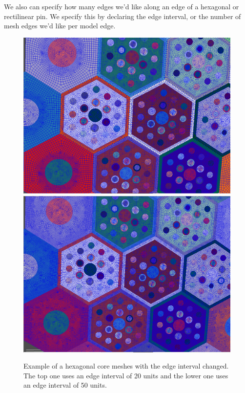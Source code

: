We also can specify how many edges we'd like along an edge of a hexagonal or rectilinear pin.  We specify this by declaring the edge interval, or the number of mesh edges we'd like per model edge.

\begin{figure}[H]
	\begin{center}
		\includegraphics[width=0.5\linewidth]{Images/edge-interval-20.png}
		\includegraphics[width=0.5\linewidth]{Images/edge-interval-50.png}

		\caption{Example of a hexagonal core meshes with the edge interval changed.  The top one uses an edge interval of 20 units and the lower one uses an edge interval of 50 units.}
		\label{fig:EdgeInterval}
	\end{center}
\end{figure}


